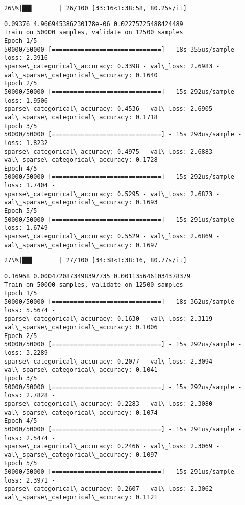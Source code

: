 \documentclass[11pt]{article}
\begin{document}
    \begin{Verbatim}[commandchars=\\\{\}]
 26\%|██▌       | 26/100 [33:16<1:38:58, 80.25s/it]
    \end{Verbatim}

    \begin{Verbatim}[commandchars=\\\{\}]
0.09376 4.966945386230178e-06 0.02275725488424489
Train on 50000 samples, validate on 12500 samples
Epoch 1/5
50000/50000 [==============================] - 18s 355us/sample - loss: 2.3916 -
sparse\_categorical\_accuracy: 0.3398 - val\_loss: 2.6983 -
val\_sparse\_categorical\_accuracy: 0.1640
Epoch 2/5
50000/50000 [==============================] - 15s 292us/sample - loss: 1.9506 -
sparse\_categorical\_accuracy: 0.4536 - val\_loss: 2.6905 -
val\_sparse\_categorical\_accuracy: 0.1718
Epoch 3/5
50000/50000 [==============================] - 15s 293us/sample - loss: 1.8232 -
sparse\_categorical\_accuracy: 0.4975 - val\_loss: 2.6883 -
val\_sparse\_categorical\_accuracy: 0.1728
Epoch 4/5
50000/50000 [==============================] - 15s 292us/sample - loss: 1.7404 -
sparse\_categorical\_accuracy: 0.5295 - val\_loss: 2.6873 -
val\_sparse\_categorical\_accuracy: 0.1693
Epoch 5/5
50000/50000 [==============================] - 15s 291us/sample - loss: 1.6749 -
sparse\_categorical\_accuracy: 0.5529 - val\_loss: 2.6869 -
val\_sparse\_categorical\_accuracy: 0.1697
    \end{Verbatim}

    \begin{Verbatim}[commandchars=\\\{\}]
 27\%|██▋       | 27/100 [34:38<1:38:16, 80.77s/it]
    \end{Verbatim}

    \begin{Verbatim}[commandchars=\\\{\}]
0.16968 0.0004720873498397735 0.0011356461034378379
Train on 50000 samples, validate on 12500 samples
Epoch 1/5
50000/50000 [==============================] - 18s 362us/sample - loss: 5.5674 -
sparse\_categorical\_accuracy: 0.1630 - val\_loss: 2.3119 -
val\_sparse\_categorical\_accuracy: 0.1006
Epoch 2/5
50000/50000 [==============================] - 15s 292us/sample - loss: 3.2289 -
sparse\_categorical\_accuracy: 0.2077 - val\_loss: 2.3094 -
val\_sparse\_categorical\_accuracy: 0.1041
Epoch 3/5
50000/50000 [==============================] - 15s 292us/sample - loss: 2.7828 -
sparse\_categorical\_accuracy: 0.2283 - val\_loss: 2.3080 -
val\_sparse\_categorical\_accuracy: 0.1074
Epoch 4/5
50000/50000 [==============================] - 15s 291us/sample - loss: 2.5474 -
sparse\_categorical\_accuracy: 0.2466 - val\_loss: 2.3069 -
val\_sparse\_categorical\_accuracy: 0.1097
Epoch 5/5
50000/50000 [==============================] - 15s 291us/sample - loss: 2.3971 -
sparse\_categorical\_accuracy: 0.2607 - val\_loss: 2.3062 -
val\_sparse\_categorical\_accuracy: 0.1121
    \end{Verbatim}
\end{document}
